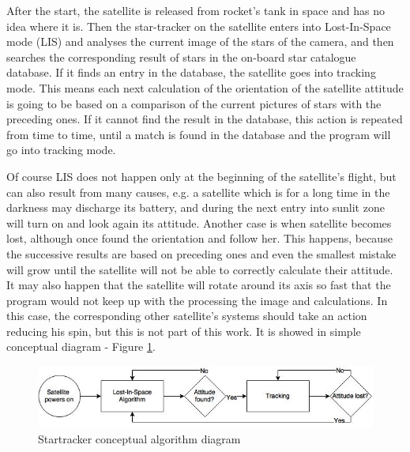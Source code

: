 \documentclass[12pt,a4paper,oneside]{article}
\begin{document}
After the start, the satellite is released from rocket's tank in space and has no idea where it is. Then the star-tracker on the satellite enters into Lost-In-Space mode (LIS) and analyses the current image of the stars of the camera, and then searches the corresponding result of stars in the on-board star catalogue database. If it finds an entry in the database, the satellite goes into tracking mode. This means each next calculation of the orientation of the satellite attitude is going to be based on a comparison of the current pictures of stars with the preceding ones. If it cannot find the result in the database, this action is repeated from time to time, until a match is found in the database and the program will go into tracking mode.

Of course LIS does not happen only at the beginning of the satellite's flight, but can also result from many causes, e.g. a satellite which is for a long time in the darkness may discharge its battery, and during the next entry into sunlit zone will turn on and look again its attitude. Another case is when satellite becomes lost, although once found the orientation and follow her. This happens, because the successive results are based on preceding ones and even the smallest mistake will grow until the satellite will not be able to correctly calculate their attitude. It may also happen that the satellite will rotate around its axis so fast that the program would not keep up with the processing the image and calculations. In this case, the corresponding other satellite's systems should take an action reducing his spin, but this is not part of this work. It is showed in simple conceptual diagram - Figure \ref{fig:startracker_conceptual_alg}.

\begin{figure}[ht]
\includegraphics[scale=0.59]{startracker_eng.jpg}
\centering
\caption{Startracker conceptual algorithm diagram}
\label{fig:startracker_conceptual_alg}
\end{figure}
\end{document}
